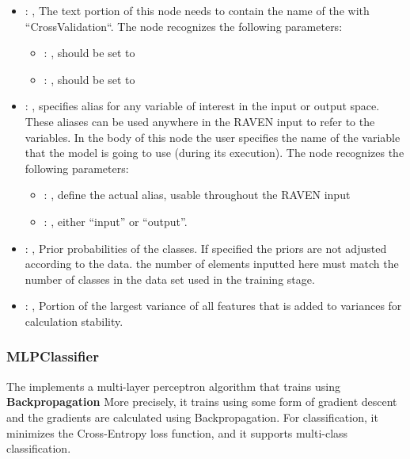 \begin{itemize}
    \item {}: , 
      The text portion of this node needs to contain the name of the  with
               ``CrossValidation``.
      The  node recognizes the following parameters:
        \begin{itemize}
          \item {}: , 
            should be set to 
          \item {}: , 
            should be set to 
      \end{itemize}

    \item {}: , 
      specifies alias for         any variable of interest in the input or output space. These
      aliases can be used anywhere in the RAVEN input to         refer to the variables. In the body
      of this node the user specifies the name of the variable that the model is going to use
      (during its execution).
      The  node recognizes the following parameters:
        \begin{itemize}
          \item {}: , 
            define the actual alias, usable throughout the RAVEN input
          \item {}: , 
            either ``input'' or ``output''.
      \end{itemize}

    \item {}: , 
      Prior probabilities of the classes. If specified the priors are
      not adjusted according to the data. \nb the number of elements inputted here must
      match the number of classes in the data set used in the training stage.

    \item {}: , 
      Portion of the largest variance of all features that is added to variances for
      calculation stability.
  \end{itemize}


\subsubsection{MLPClassifier}
  The  implements a multi-layer perceptron algorithm that trains using
  \textbf{Backpropagation}                             More precisely, it trains using some form of
  gradient descent and the gradients are calculated using Backpropagation.
  For classification, it minimizes the Cross-Entropy loss function, and it supports multi-class
  classification.                             

